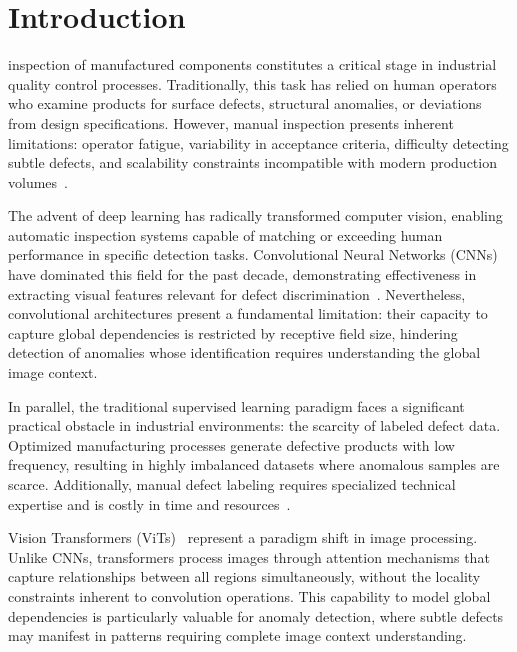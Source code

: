 \documentclass[journal,twoside,web]{ieeecolor}
\begin{document}
\section{Introduction}
\label{sec:introduction}

 inspection of manufactured components constitutes a critical stage in industrial quality control processes. Traditionally, this task has relied on human operators who examine products for surface defects, structural anomalies, or deviations from design specifications. However, manual inspection presents inherent limitations: operator fatigue, variability in acceptance criteria, difficulty detecting subtle defects, and scalability constraints incompatible with modern production volumes~\cite{alber2024evaluating}.

The advent of deep learning has radically transformed computer vision, enabling automatic inspection systems capable of matching or exceeding human performance in specific detection tasks. Convolutional Neural Networks (CNNs) have dominated this field for the past decade, demonstrating effectiveness in extracting visual features relevant for defect discrimination~\cite{wang2022defect}. Nevertheless, convolutional architectures present a fundamental limitation: their capacity to capture global dependencies is restricted by receptive field size, hindering detection of anomalies whose identification requires understanding the global image context.

In parallel, the traditional supervised learning paradigm faces a significant practical obstacle in industrial environments: the scarcity of labeled defect data. Optimized manufacturing processes generate defective products with low frequency, resulting in highly imbalanced datasets where anomalous samples are scarce. Additionally, manual defect labeling requires specialized technical expertise and is costly in time and resources~\cite{huang2025semiconductor}.

Vision Transformers (ViTs)~\cite{dosovitskiy2021vit} represent a paradigm shift in image processing. Unlike CNNs, transformers process images through attention mechanisms that capture relationships between all regions simultaneously, without the locality constraints inherent to convolution operations. This capability to model global dependencies is particularly valuable for anomaly detection, where subtle defects may manifest in patterns requiring complete image context understanding.
\end{document}
